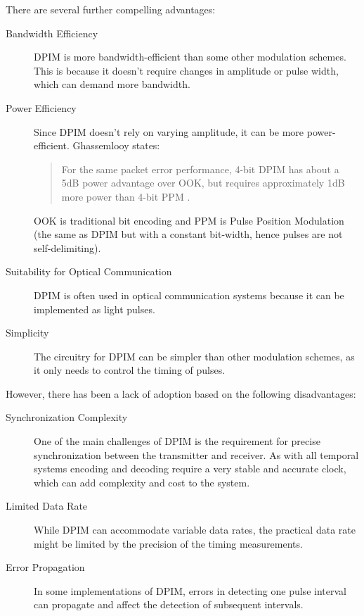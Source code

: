 \documentclass{article}
\begin{document}
There are several further compelling advantages:

\begin{description}

	\item [Bandwidth Efficiency] DPIM is more bandwidth-efficient than some other modulation schemes. This is because it doesn't require changes in amplitude or pulse width, which can demand more bandwidth.
	\item [Power Efficiency] Since DPIM doesn't rely on varying amplitude, it can be more power-efficient. Ghassemlooy states:

	      \begin{quote}
		      For the same packet error performance, 4-bit DPIM has about a 5dB power advantage over OOK, but requires approximately 1dB more power than 4-bit PPM \cite{ghassemlooy2000digital}.
	      \end{quote}

	      OOK is traditional bit encoding and PPM is Pulse Position Modulation (the same as DPIM but with a constant bit-width, hence pulses are not self-delimiting).

	\item [Suitability for Optical Communication] DPIM is often used in optical communication systems because it can be implemented as light pulses.
	\item [Simplicity] The circuitry for DPIM can be simpler than other modulation schemes, as it only needs to control the timing of pulses.
\end{description}

However, there has been a lack of adoption based on the following disadvantages:

\begin{description}

	\item[Synchronization Complexity] One of the main challenges of DPIM is the requirement for precise synchronization between the transmitter and receiver. As with all temporal systems encoding and decoding require a very stable and accurate clock, which can add complexity and cost to the system.
	\item[Limited Data Rate] While DPIM can accommodate variable data rates, the practical data rate might be limited by the precision of the timing measurements.
	\item[Error Propagation] In some implementations of DPIM, errors in detecting one pulse interval can propagate and affect the detection of subsequent intervals.
\end{description}
\end{document}
